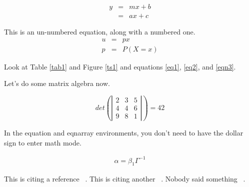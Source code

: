 \begin{eqnarray}
y &=& mx + b \label{eq1}\\
&=& ax+ c
\label{eq2}
\end{eqnarray}

This is an un-numbered equation, along with a numbered one. 
\begin{eqnarray}
u &=& px \nonumber\\
p &=& P(X=x) \label{eqn3}
\end{eqnarray}

Look at Table \ref{tab1} and Figure \ref{ts1} and equations \ref{eq1},  \ref{eq2}, and \ref{eqn3}.

Let's do some matrix algebra now.

\begin{equation}
det\left(\left|\begin{array}{ccc} 2 & 3 & 5\\
4 & 4 & 6\\
9 & 8 & 1
\end{array}\right|\right) = 42
\end{equation}

In the equation and eqnarray environments, you don't need to have the dollar sign to enter math mode.

\begin{eqnarray}
\alpha = \beta_1 \Gamma^{-1}
\end{eqnarray}

This is citing a reference ~\cite{mygood11111}.  This is citing another ~\cite{mrx05}.  Nobody said something ~\cite{Nobody06}.
